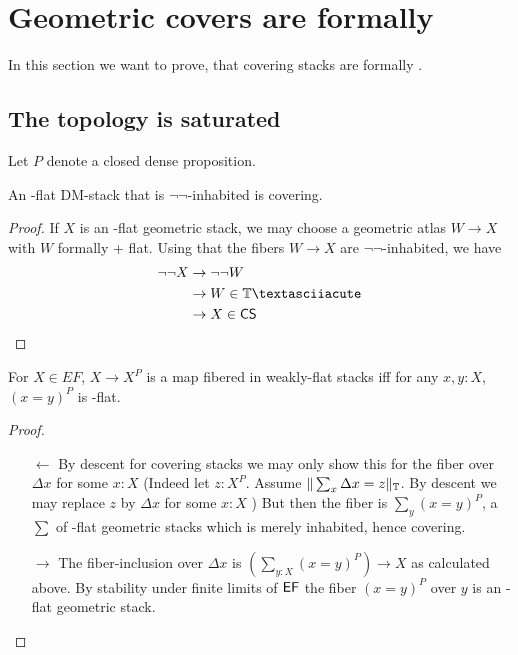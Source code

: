 \section{Geometric covers are formally \etale}
In this section we want to prove, that covering stacks are formally \etale.
\subsection{The \etale topology is saturated}
Let $P$ denote a closed dense proposition.
\begin{lemma}{\label{lemma:covOfEF}}
	An \etale-flat DM-stack that is $\lnot \lnot$-inhabited is covering.
\end{lemma}
\begin{proof}
	If $X$ is an \etale-flat geometric stack, we may choose a geometric atlas $W \to X$ with $W$ formally \etale + flat. Using that the fibers $W \to X$ are $\lnot \lnot$-inhabited, we have 
	\begin{align*}
		\lnot \lnot X &\to \lnot \lnot W \\
		&\to W \in \bT  ´\\
		&\to X \in \CS \\
	\end{align*}
\end{proof}
\begin{lemma}{\label{lemma:wfcover}}
	For $X \in EF$, $X \to X^P$ is a map fibered in weakly-flat stacks iff for any $x, y : X$, $(x = y)^P$ is \etale-flat.
\end{lemma}
\begin{proof}
	\begin{itemize}
		
		\item[$\leftarrow$]
		By descent for covering stacks we may only show this for the fiber over $\Delta x $ for some $x  : X$ (Indeed let $z : X^P$. Assume $\|\sum_x \Delta x = z \|_{\mathbb{T}}$. By descent we may replace $z$ by $\Delta x$ for some $x : X$ ) 
		But then the fiber is $\sum_y (x = y)^P$, a $\sum$ of \etale-flat geometric stacks which is merely inhabited, hence covering.
		\item[$\rightarrow$]The fiber-inclusion over $\Delta x$ is $(\sum_{y : X} (x = y)^P) \to X$ as calculated above. By stability under finite limits of $\mathsf{EF}$ the fiber $(x = y)^P$ over $y$ is an \etale-flat geometric stack.
	\end{itemize}
\end{proof}
